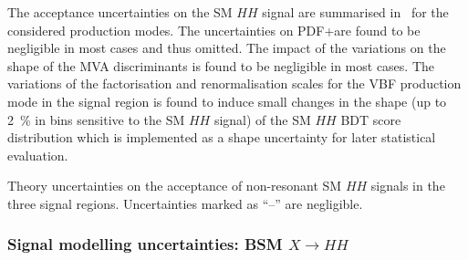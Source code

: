 
The acceptance uncertainties on the SM $HH$ signal are summarised
in~ for the considered production
modes. The uncertainties on PDF+\alphas are found to be negligible in
most cases and thus omitted. The impact of the variations on the shape
of the MVA discriminants is found to be negligible in most cases. The
variations of the factorisation and renormalisation scales for the VBF
production mode in the \hadhad signal region is found to induce small
changes in the shape (up to \SI{2}{\percent} in bins sensitive to the
SM $HH$ signal) of the SM $HH$ BDT score distribution which is
implemented as a shape uncertainty for later statistical evaluation.

\begin{table}[htbp]
  \centering

  

  \caption{Theory uncertainties on the acceptance of non-resonant SM
    $HH$ signals in the three signal regions. Uncertainties marked as
    ``--'' are negligible.}
  \label{tab:theory_uncertainty_signal}
\end{table}


\subsubsection{Signal modelling uncertainties: BSM $X \to HH$}


